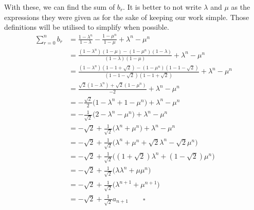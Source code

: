 \documentclass[a4paper]{article}
\begin{document}
With these, we can find the sum of $b_r$.
It is better to not write $\lambda$ and $\mu$ as the expressions they were given as for the sake of keeping our work simple.
Those definitions will be utilised to simplify when possible.
\begin{align*}
    \sum_{r=0}^{n} b_r & = \frac{1-\lambda^n}{1-\lambda} - \frac{1-\mu^n}{1-\mu} + \lambda^n - \mu^n                                      \\
                       & = \frac{(1-\lambda^n)(1-\mu) - (1-\mu^n)(1-\lambda)}{(1-\lambda)(1-\mu)} + \lambda^n - \mu^n                     \\
                       & = \frac{(1-\lambda^n)(1-1+\sqrt{2}) - (1-\mu^n)(1-1-\sqrt{2})}{(1-1-\sqrt{2})(1-1+\sqrt{2})} + \lambda^n - \mu^n \\
                       & = \frac{\sqrt{2}(1-\lambda^n) + \sqrt{2}(1-\mu^n)}{-2} + \lambda^n - \mu^n                                       \\
                       & = -\frac{\sqrt{2}}{2}\bigg(1-\lambda^n+1-\mu^n\bigg) + \lambda^n - \mu^n                                         \\
                       & = -\frac{1}{\sqrt{2}}\bigg(2-\lambda^n-\mu^n\bigg) + \lambda^n - \mu^n                                           \\
                       & = -\sqrt{2} + \frac{1}{\sqrt{2}}\bigg(\lambda^n+\mu^n\bigg) + \lambda^n - \mu^n                                  \\
                       & = -\sqrt{2} + \frac{1}{\sqrt{2}}\bigg(\lambda^n+\mu^n + \sqrt{2}\lambda^n - \sqrt{2}\mu^n\bigg)                  \\
                       & = -\sqrt{2} + \frac{1}{\sqrt{2}}\bigg(\left(1+\sqrt{2}\right)\lambda^n + \left(1-\sqrt{2}\right)\mu^n\bigg)      \\
                       & = -\sqrt{2} + \frac{1}{\sqrt{2}}\bigg(\lambda\lambda^n + \mu\mu^n\bigg)                                          \\
                       & = -\sqrt{2} + \frac{1}{\sqrt{2}}\bigg(\lambda^{n+1} + \mu^{n+1}\bigg)                                            \\
                       & = -\sqrt{2} + \frac{1}{\sqrt{2}}a_{n+1} \qquad \square
\end{align*}
\end{document}
